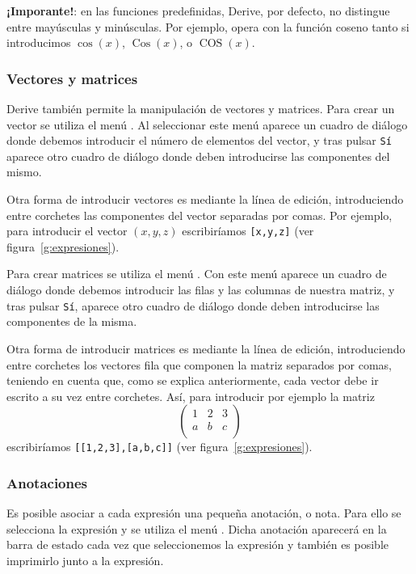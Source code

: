 \textbf{¡Imporante!}: en las funciones predefinidas, Derive, por
defecto, no distingue entre mayúsculas y minúsculas. Por ejemplo,
opera con la función coseno tanto si introducimos $\cos(x)$,
$\operatorname {Cos}(x)$, o $\operatorname {COS}(x)$.

\subsubsection*{Vectores y matrices}
Derive también permite la manipulación de vectores y matrices. Para
crear un vector se utiliza el menú . Al
seleccionar este menú aparece un cuadro de diálogo donde debemos
introducir el número de elementos del vector, y tras pulsar
\texttt{Sí} aparece otro cuadro de diálogo donde deben introducirse
las componentes del mismo.

Otra forma de introducir vectores es mediante la línea de edición,
introduciendo entre corchetes las componentes del vector separadas
por comas. Por ejemplo, para introducir el vector $(x,y,z)$
escribiríamos \texttt{[x,y,z]} (ver figura~\ref{g:expresiones}).

Para crear matrices se utiliza el menú .
Con este menú aparece un cuadro de diálogo donde debemos introducir
las filas y las columnas de nuestra matriz, y tras pulsar
\texttt{Sí}, aparece otro cuadro de diálogo donde deben introducirse
las componentes de la misma.

Otra forma de introducir matrices es mediante la línea de edición,
introduciendo entre corchetes los vectores fila que componen la
matriz separados por comas, teniendo en cuenta que, como se explica
anteriormente, cada vector debe ir escrito a su vez entre corchetes.
Así, para introducir por ejemplo la matriz
\[
\left(
\begin{array}{ccc}
 1 & 2 & 3 \\
 a & b & c \\
\end{array}
\right)
\]
escribiríamos \texttt{[[1,2,3],[a,b,c]]} (ver
figura~\ref{g:expresiones}).

\subsubsection*{Anotaciones}
Es posible asociar a cada expresión una pequeña anotación, o nota.
Para ello se selecciona la expresión y se utiliza el menú
. Dicha anotación aparecerá en la barra de
estado cada vez que seleccionemos la expresión y también es posible
imprimirlo junto a la expresión.

